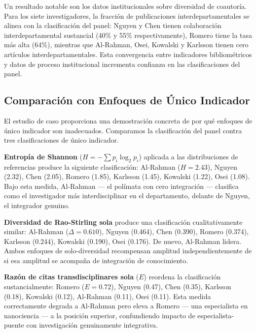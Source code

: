 \documentclass[
]{article}
\begin{document}
Un resultado notable son los datos institucionales sobre diversidad de
coautoría. Para los siete investigadores, la fracción de publicaciones
interdepartamentales se alinea con la clasificación del panel: Nguyen y
Chen tienen colaboración interdepartamental sustancial (40\% y 55\%
respectivamente), Romero tiene la tasa más alta (64\%), mientras que
Al-Rahman, Osei, Kowalski y Karlsson tienen cero artículos
interdepartamentales. Esta convergencia entre indicadores bibliométricos
y datos de proceso institucional incrementa confianza en las
clasificaciones del panel.

\hypertarget{comparaciuxf3n-con-enfoques-de-uxfanico-indicador}{%
\subsection{Comparación con Enfoques de Único
Indicador}\label{comparaciuxf3n-con-enfoques-de-uxfanico-indicador}}

El estudio de caso proporciona una demostración concreta de por qué
enfoques de único indicador son inadecuados. Comparamos la clasificación
del panel contra tres clasificaciones de único indicador.

\textbf{Entropía de Shannon} (\(H = -\sum p_i \log_2 p_i\)) aplicada a
las distribuciones de referencias produce la siguiente clasificación:
Al-Rahman (\(H = 2.43\)), Nguyen (2.32), Chen (2.05), Romero (1.85),
Karlsson (1.45), Kowalski (1.22), Osei (1.08). Bajo esta medida,
Al-Rahman --- el polímata con cero integración --- clasifica como el
investigador más interdisciplinar en el departamento, delante de Nguyen,
el integrador genuino.

\textbf{Diversidad de Rao-Stirling sola} produce una clasificación
cualitativamente similar: Al-Rahman (\(\Delta = 0.610\)), Nguyen
(0.464), Chen (0.390), Romero (0.374), Karlsson (0.244), Kowalski
(0.190), Osei (0.176). De nuevo, Al-Rahman lidera. Ambos enfoques de
solo-diversidad recompensan amplitud independientemente de si esa
amplitud se acompaña de integración de conocimiento.

\textbf{Razón de citas transdisciplinares sola} (\(E\)) reordena la
clasificación sustancialmente: Romero (\(E = 0.72\)), Nguyen (0.47),
Chen (0.35), Karlsson (0.18), Kowalski (0.12), Al-Rahman (0.11), Osei
(0.11). Esta medida correctamente degrada a Al-Rahman pero eleva a
Romero --- una especialista en nanociencia --- a la posición superior,
confundiendo impacto de especialista-puente con investigación
genuinamente integrativa.
\end{document}
